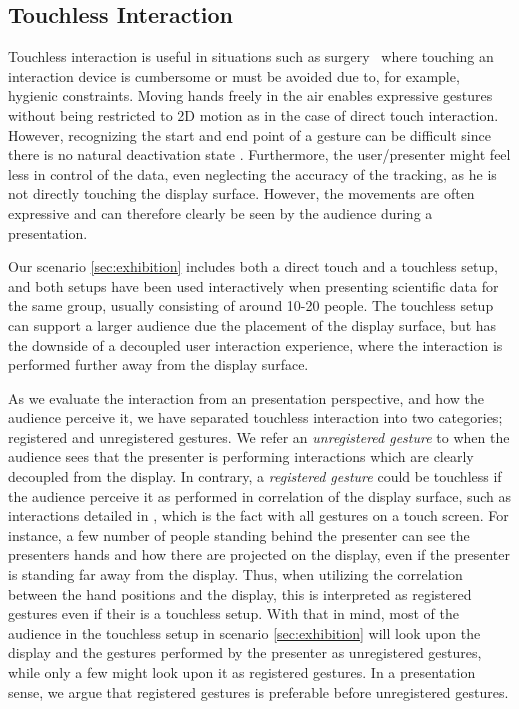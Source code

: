 \documentclass[review,journal]{vgtc}         %
\begin{document}
\subsection{Touchless Interaction}\label{subsec:touchless}
Touchless interaction is useful in situations such as surgery~\cite{Mentis:2012:IPI:2207676.2208536} where touching an interaction device is cumbersome or must be avoided due to, for example, hygienic constraints.
Moving hands freely in the air enables expressive gestures without being restricted to 2D motion as in the case of direct touch interaction.
However, recognizing the start and end point of a gesture can be difficult since there is no natural deactivation state \cite{Kirmizibayrak:2011:EGB:2087756.2087764}.
Furthermore, the user/presenter might feel less in control of the data, even neglecting the accuracy of the tracking, as he is not directly touching the display surface.
However, the movements are often expressive and can therefore clearly be seen by the audience during a presentation.

Our scenario \ref{sec:exhibition} includes both a direct touch and a touchless setup, and both setups have been used interactively when presenting scientific data for the same group, usually consisting of around 10-20 people.
The touchless setup can support a larger audience due the placement of the display surface, but has the downside of a decoupled user interaction experience, where the interaction is performed further away from the display surface.

As we evaluate the interaction from an presentation perspective, and how the audience perceive it, we have separated touchless interaction into two categories; registered and unregistered gestures.
We refer an \emph{unregistered gesture} to when the audience sees that the presenter is performing interactions which are clearly decoupled from the display. 
In contrary, a \emph{registered gesture} could be touchless if the audience perceive it as performed in correlation of the display surface, such as interactions detailed in \cite{Bezerianos:2007:DSU:1467769}, which is the fact with all gestures on a touch screen. 
For instance, a few number of people standing behind the presenter can see the presenters hands and how there are projected on the display, even if the presenter is standing far away from the display.
Thus, when utilizing the correlation between the hand positions and the display, this is interpreted as registered gestures even if their is a touchless setup.  
With that in mind, most of the audience in the touchless setup in scenario \ref{sec:exhibition} will look upon the display and the gestures performed by the presenter as unregistered gestures, while only a few might look upon it as registered gestures.
In a presentation sense, we argue that registered gestures is preferable before unregistered gestures.
 
\end{document}
